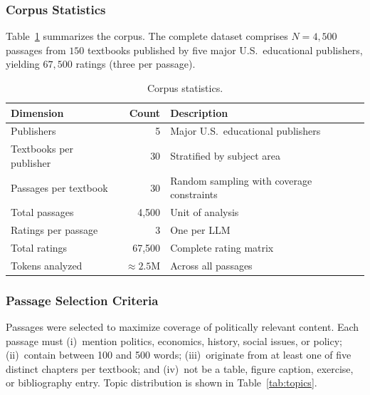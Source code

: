 \documentclass[10pt,letterpaper]{article}
\begin{document}
\subsubsection{Corpus Statistics}

Table~\ref{tab:corpus} summarizes the corpus.  The complete dataset comprises
$N = 4{,}500$ passages from $150$ textbooks published by five major U.S.\
educational publishers, yielding $67{,}500$ ratings (three per passage).

\begin{table}[h]
\centering
\caption{Corpus statistics.}
\label{tab:corpus}
\begin{tabular}{lrl}
\toprule
\textbf{Dimension} & \textbf{Count} & \textbf{Description} \\
\midrule
Publishers                  & 5       & Major U.S.\ educational publishers \\
Textbooks per publisher     & 30      & Stratified by subject area \\
Passages per textbook       & 30      & Random sampling with coverage constraints \\
Total passages              & 4,500   & Unit of analysis \\
Ratings per passage         & 3       & One per LLM \\
Total ratings               & 67,500  & Complete rating matrix \\
Tokens analyzed             & ${\approx}2.5\text{M}$ & Across all passages \\
\bottomrule
\end{tabular}
\end{table}

\subsubsection{Passage Selection Criteria}

Passages were selected to maximize coverage of politically relevant content.
Each passage must (i)~mention politics, economics, history, social issues, or
policy; (ii)~contain between 100 and 500 words; (iii)~originate from at least
one of five distinct chapters per textbook; and (iv)~not be a table, figure
caption, exercise, or bibliography entry.  Topic distribution is shown in
Table~\ref{tab:topics}.
\end{document}
